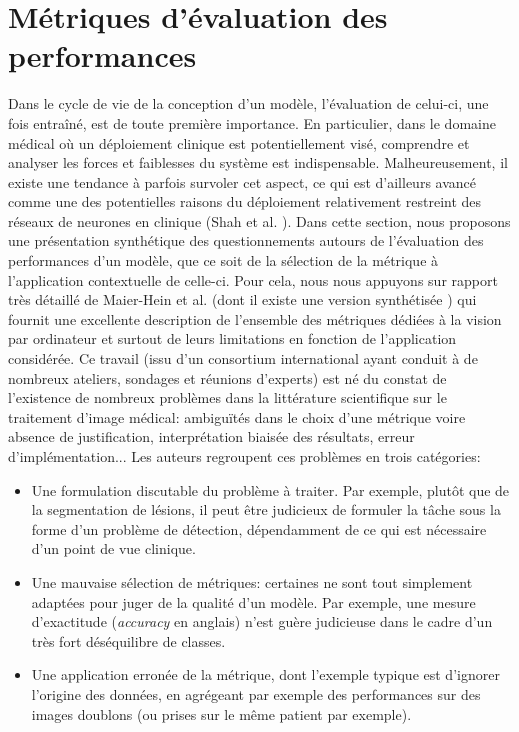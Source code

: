 \section{Métriques d'évaluation des performances}
\label{sec:EvaluationMetrics}
Dans le cycle de vie de la conception d'un modèle, l'évaluation de celui-ci, une fois entraîné, est de toute première importance. En particulier, dans le domaine médical où un déploiement clinique est potentiellement visé, comprendre et analyser les forces et faiblesses du système est indispensable. Malheureusement, il existe une tendance à parfois survoler cet aspect, ce qui est d'ailleurs avancé  comme une des potentielles raisons du déploiement relativement restreint des réseaux de neurones en clinique (Shah et al. \cite{shahMakingMachineLearning2019}). Dans cette section, nous proposons une présentation synthétique des questionnements autours de l'évaluation des performances d'un modèle, que ce soit de la sélection de la métrique à l'application contextuelle de celle-ci. Pour cela, nous nous appuyons sur rapport très détaillé de 
Maier-Hein et al. \cite{maier-heinMetricsReloadedPitfalls2022} (dont il existe une version synthétisée \cite{reinkeUnderstandingMetricrelatedPitfalls2023a}) qui fournit une excellente description de l'ensemble des métriques dédiées à la vision par ordinateur et surtout de leurs limitations en fonction de l'application considérée. Ce travail (issu d'un consortium international ayant conduit à de nombreux ateliers, sondages et réunions d'experts) est né du constat de l'existence de nombreux problèmes dans la littérature scientifique sur le traitement d'image médical: ambiguïtés dans le choix d'une métrique voire absence de justification, interprétation biaisée des résultats, erreur d'implémentation... Les auteurs regroupent ces problèmes en trois catégories:
\begin{itemize}
	\item Une formulation discutable du problème à traiter. Par exemple, plutôt que de la segmentation de lésions, il peut être judicieux de formuler la tâche sous la forme d'un problème de détection, dépendamment de ce qui est nécessaire d'un point de vue clinique.
	\item Une mauvaise sélection de métriques: certaines ne sont tout simplement adaptées pour juger de la qualité d'un modèle. Par exemple, une mesure d'exactitude (\textit{accuracy} en anglais) n'est guère judicieuse dans le cadre d'un très fort déséquilibre de classes.
	\item Une application erronée de la métrique, dont l'exemple typique est d'ignorer l'origine des données, en agrégeant par exemple des performances sur des images doublons (ou prises sur le même patient par exemple).
\end{itemize}

